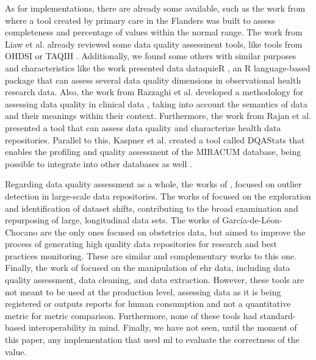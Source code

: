As for implementations, there are already some available, such as the work from \cite{phanAutomatedDataCleaning2020} where a tool created by primary care in the Flanders was built to assess completeness and percentage of values within the normal range.
The work from Liaw et al. \cite{liawQualityAssessmentRealworld2021} already reviewed some data quality assessment tools, like tools from OHDSI \cite{hripcsakObservationalHealthData2015} or TAQIH \cite{alvarezsanchezTAQIHToolTabular2019}. 
Additionally, we found some others with similar purposes and characteristics like the work presented data dataquieR \cite{schmidtFacilitatingHarmonizedData2021}, an R language-based package that can assess several data quality dimensions in observational health research data. 
Also, the work from Razzaghi et al. developed a methodology for assessing data quality in clinical data \cite{razzaghiDevelopingSystematicApproach2022}, taking into account the semantics of data and their meanings within their context. Furthermore, the work from Rajan et al. \cite{rajanContentAgnosticComputable2019} presented a tool that can assess data quality and characterize health data repositories. Parallel to this, Kaspner et al. created a tool called DQAStats that enables the profiling and quality assessment of the MIRACUM database, being possible to integrate into other databases as well \cite{kapsnerLinkingConsortiumWideData2021a}.

Regarding data quality assessment as a whole, the works of \cite{estiriSemisupervisedEncodingOutlier2019}, focused on outlier detection in large-scale data repositories. The works of \cite{saezEHRtemporalVariabilityDelineatingTemporal2020} focused on the exploration and identification of dataset shifts, contributing to the broad examination and repurposing of large, longitudinal data sets. The works of García-de-Léon-Chocano \cite{saStandardizedDataQuality2017,garcia-de-leon-chocanoConstructionQualityassuredInfant2016,garci;a-de-leon-chocanoConstructionQualityassuredInfant2015} are the only ones focused on obstetrics data, but aimed to improve the process of generating high quality data repositories for research and best practices monitoring. These are similar and complementary works to this one. Finally, the work of \cite{springateREHRPackageManipulating2017} focused on the manipulation of \ac{ehr} data, including data quality assessment, data cleaning, and data extraction. However, these tools are not meant to be used at the production level, assessing data as it is being registered or outputs reports for human consumption and not a quantitative metric for metric comparison. Furthermore, none of these tools had standard-based interoperability in mind. Finally, we have not seen, until the moment of this paper, any implementation that used \ac{ml} to evaluate the correctness of the value.
